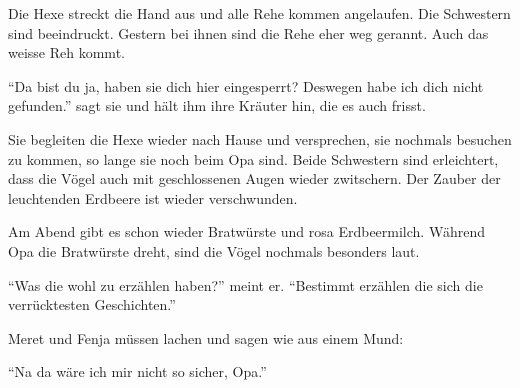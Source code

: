 Die Hexe streckt die Hand aus und alle Rehe kommen angelaufen. Die Schwestern sind beeindruckt. Gestern bei ihnen sind die Rehe eher weg gerannt. Auch das weisse Reh kommt.

\enquote{Da bist du ja, haben sie dich hier eingesperrt? Deswegen habe ich dich nicht gefunden.} sagt sie und hält ihm ihre Kräuter hin, die es auch frisst.

Sie begleiten die Hexe wieder nach Hause und versprechen, sie nochmals besuchen zu kommen, so lange sie noch beim Opa sind. Beide Schwestern sind erleichtert, dass die Vögel auch mit geschlossenen Augen wieder zwitschern. Der Zauber der leuchtenden Erdbeere ist wieder verschwunden.

Am Abend gibt es schon wieder Bratwürste und rosa Erdbeermilch. Während Opa die Bratwürste dreht, sind die Vögel nochmals besonders laut.

\enquote{Was die wohl zu erzählen haben?} meint er. \enquote{Bestimmt erzählen die sich die verrücktesten Geschichten.}

Meret und Fenja müssen lachen und sagen wie aus einem Mund:

\enquote{Na da wäre ich mir nicht so sicher, Opa.} \hfill {\color{DeepPink}\decofourleft}

